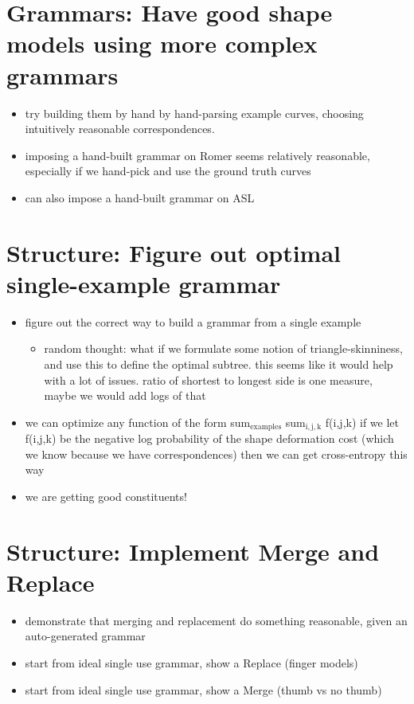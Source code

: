 \documentclass{book}
\begin{document}
\section{Grammars: Have good shape models using more complex grammars}
\label{sec-5_14}


\begin{itemize}
\item try building them by hand by hand-parsing example curves,
      choosing intuitively reasonable correspondences.
\item imposing a hand-built grammar on Romer seems relatively
      reasonable, especially if we hand-pick and use the ground truth
      curves
\item can also impose a hand-built grammar on ASL
\end{itemize}
\section{Structure: Figure out optimal single-example grammar}
\label{sec-5_15}

\begin{itemize}
\item figure out the correct way to build a grammar from a single example

\begin{itemize}
\item random thought: what if we formulate some notion of
      triangle-skinniness, and use this to define the optimal
      subtree. this seems like it would help with a lot of
      issues. ratio of shortest to longest side is one measure, maybe
      we would add logs of that
\end{itemize}

\item we can optimize any function of the form sum$_{\mathrm{examples}}$
    sum$_{\mathrm{i,j,k}}$ f(i,j,k) if we let f(i,j,k) be the negative log
    probability of the shape deformation cost (which we know because
    we have correspondences) then we can get cross-entropy this way
\item we are getting good constituents!
\end{itemize}
\section{Structure: Implement Merge and Replace}
\label{sec-5_16}

\begin{itemize}
\item demonstrate that merging and replacement do something reasonable,
    given an auto-generated grammar
\item start from ideal single use grammar, show a Replace (finger models)
\item start from ideal single use grammar, show a Merge (thumb vs no thumb)
\end{itemize}
\end{document}
